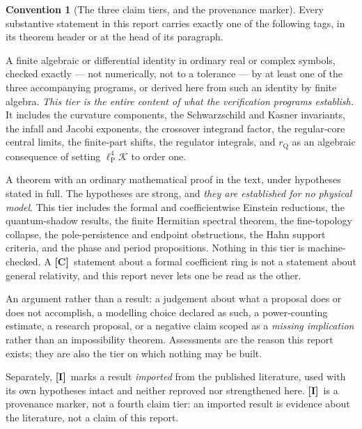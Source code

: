 \documentclass[11pt,letterpaper]{article}
\numberwithin{equation}{section}
\theoremstyle{definition}
\newtheorem{convention}[theorem]{Convention}
\theoremstyle{remark}
\newcommand{\Kret}{\mathcal K}
\newcommand{\lP}{\ell_{\mathrm P}}
\newcommand{\TE}{\textcolor{TierE}{\textsf{\bfseries[E]}}}
\newcommand{\TC}{\textcolor{TierC}{\textsf{\bfseries[C]}}}
\newcommand{\TA}{\textcolor{TierA}{\textsf{\bfseries[A]}}}
\newcommand{\TI}{\textcolor{TierI}{\textsf{\bfseries[I]}}}
\begin{document}
\begin{convention}[The three claim tiers, and the provenance marker]
\label{phys:conv:tiers}
Every substantive statement in this report carries exactly one of the
following tags, in its theorem header or at the head of its paragraph.
\begin{description}[style=nextline,leftmargin=0pt,labelsep=0pt]
\item[\TE\ Exact symbolic identity.]
A finite algebraic or differential identity in ordinary real or complex
symbols, checked exactly --- not numerically, not to a tolerance --- by at
least one of the three accompanying programs, or derived here from such an
identity by finite algebra. \emph{This tier is the entire content of what the
verification programs establish.} It includes the curvature components, the
Schwarzschild and Kasner invariants, the infall and Jacobi exponents, the
crossover integrand factor, the regular-core central limits, the finite-part
shifts, the regulator integrals, and $r_{\mathrm Q}$ as an algebraic
consequence of setting $\lP^{4}\Kret$ to order one.
\item[\TC\ Conditional mathematical theorem.]
A theorem with an ordinary mathematical proof in the text, under hypotheses
stated in full. The hypotheses are strong, and \emph{they are established for
no physical model}. This tier includes the formal and coefficientwise Einstein
reductions, the quantum-shadow results, the finite Hermitian spectral theorem,
the fine-topology collapse, the pole-persistence and endpoint obstructions, the
Hahn support criteria, and the phase and period propositions. Nothing in this
tier is machine-checked. A \TC\ statement about a formal coefficient ring is
not a statement about general relativity, and this report never lets one be
read as the other.
\item[\TA\ Assessment.]
An argument rather than a result: a judgement about what a proposal does or
does not accomplish, a modelling choice declared as such, a power-counting
estimate, a research proposal, or a negative claim scoped as a \emph{missing
implication} rather than an impossibility theorem. Assessments are the reason
this report exists; they are also the tier on which nothing may be built.
\end{description}
Separately, \TI\ marks a result \emph{imported} from the published literature,
used with its own hypotheses intact and neither reproved nor strengthened here.
\TI\ is a provenance marker, not a fourth claim tier: an imported result is
evidence about the literature, not a claim of this report.
\end{convention}
\end{document}
